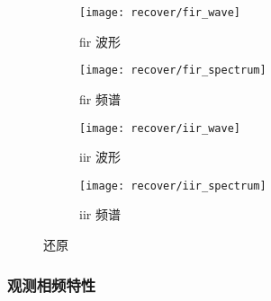 \documentclass[../main]{subfiles}
\begin{document}
\begin{figure}[htbp]
  \centering
  \begin{subfigure}[htbp]{0.45\linewidth}
    \centering
    \texttt{[image: recover/fir\_wave]}
    \caption{fir 波形}%
    \label{fig:recover/fir_wave}
  \end{subfigure}
  \quad
  \begin{subfigure}[htbp]{0.45\linewidth}
    \centering
    \texttt{[image: recover/fir\_spectrum]}
    \caption{fir 频谱}%
    \label{fig:recover/fir_spectrum}
  \end{subfigure}

  \begin{subfigure}[htbp]{0.45\linewidth}
    \centering
    \texttt{[image: recover/iir\_wave]}
    \caption{iir 波形}%
    \label{fig:recover/iir_wave}
  \end{subfigure}
  \quad
  \begin{subfigure}[htbp]{0.45\linewidth}
    \centering
    \texttt{[image: recover/iir\_spectrum]}
    \caption{iir 频谱}%
    \label{fig:recover/iir_spectrum}
  \end{subfigure}
  \quad
  \caption{还原}%
  \label{fig:recover}
\end{figure}


\subsubsection{观测相频特性}%
\label{ssub:phase}


\end{document}
